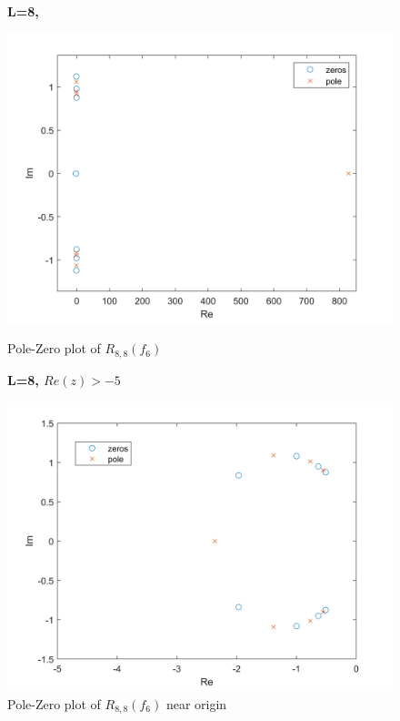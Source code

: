 \documentclass[10pt]{article}
\begin{document}
\begin{figure}[H]
    \begin{minipage}[b]{0.47\linewidth}
            \centering
            \textbf{L=8, }\par
            \includegraphics[width=\textwidth]{Files/q5,f6,7.png}
            \caption{Pole-Zero plot of $R_{8,8}(f_6)$}
        \end{minipage}
        \hfill
            \begin{minipage}[b]{0.47\linewidth}
            \centering
    \textbf{L=8, $Re(z)>-5$}\par
    \includegraphics[width=\textwidth]{Files/q5,f6,8_ring.png}
    \caption{Pole-Zero plot of $R_{8,8}(f_6)$ near origin}
        \end{minipage}
\end{figure}
\end{document}
